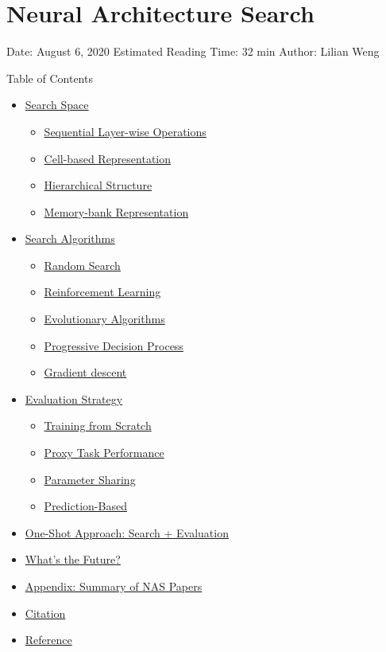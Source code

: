 \section{Neural Architecture Search}\label{neural-architecture-search}

Date: August 6, 2020 \textbar{} Estimated Reading Time: 32 min \textbar{} Author: Lilian Weng

{Table of Contents}

\begin{itemize}
\tightlist
\item
  \hyperref[search-space]{Search Space}

  \begin{itemize}
  \tightlist
  \item
    \hyperref[sequential-layer-wise-operations]{Sequential Layer-wise Operations}
  \item
    \hyperref[cell-based-representation]{Cell-based Representation}
  \item
    \hyperref[hierarchical-structure]{Hierarchical Structure}
  \item
    \hyperref[memory-bank-representation]{Memory-bank Representation}
  \end{itemize}
\item
  \hyperref[search-algorithms]{Search Algorithms}

  \begin{itemize}
  \tightlist
  \item
    \hyperref[random-search]{Random Search}
  \item
    \hyperref[reinforcement-learning]{Reinforcement Learning}
  \item
    \hyperref[evolutionary-algorithms]{Evolutionary Algorithms}
  \item
    \hyperref[progressive-decision-process]{Progressive Decision Process}
  \item
    \hyperref[gradient-descent]{Gradient descent}
  \end{itemize}
\item
  \hyperref[evaluation-strategy]{Evaluation Strategy}

  \begin{itemize}
  \tightlist
  \item
    \hyperref[training-from-scratch]{Training from Scratch}
  \item
    \hyperref[proxy-task-performance]{Proxy Task Performance}
  \item
    \hyperref[parameter-sharing]{Parameter Sharing}
  \item
    \hyperref[prediction-based]{Prediction-Based}
  \end{itemize}
\item
  \hyperref[one-shot-approach-search--evaluation]{One-Shot Approach: Search + Evaluation}
\item
  \hyperref[whats-the-future]{What's the Future?}
\item
  \hyperref[appendix-summary-of-nas-papers]{Appendix: Summary of NAS Papers}
\item
  \hyperref[citation]{Citation}
\item
  \hyperref[reference]{Reference}
\end{itemize}

